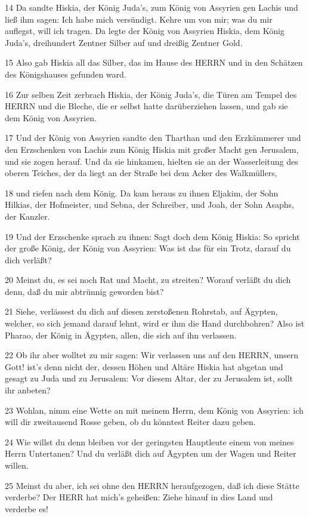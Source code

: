 \par 14 Da sandte Hiskia, der König Juda's, zum König von Assyrien gen Lachis und ließ ihm sagen: Ich habe mich versündigt. Kehre um von mir; was du mir auflegst, will ich tragen. Da legte der König von Assyrien Hiskia, dem König Juda's, dreihundert Zentner Silber auf und dreißig Zentner Gold.
\par 15 Also gab Hiskia all das Silber, das im Hause des HERRN und in den Schätzen des Königshauses gefunden ward.
\par 16 Zur selben Zeit zerbrach Hiskia, der König Juda's, die Türen am Tempel des HERRN und die Bleche, die er selbst hatte darüberziehen lassen, und gab sie dem König von Assyrien.
\par 17 Und der König von Assyrien sandte den Tharthan und den Erzkämmerer und den Erzschenken von Lachis zum König Hiskia mit großer Macht gen Jerusalem, und sie zogen herauf. Und da sie hinkamen, hielten sie an der Wasserleitung des oberen Teiches, der da liegt an der Straße bei dem Acker des Walkmüllers,
\par 18 und riefen nach dem König. Da kam heraus zu ihnen Eljakim, der Sohn Hilkias, der Hofmeister, und Sebna, der Schreiber, und Joah, der Sohn Asaphs, der Kanzler.
\par 19 Und der Erzschenke sprach zu ihnen: Sagt doch dem König Hiskia: So spricht der große König, der König von Assyrien: Was ist das für ein Trotz, darauf du dich verläßt?
\par 20 Meinst du, es sei noch Rat und Macht, zu streiten? Worauf verläßt du dich denn, daß du mir abtrünnig geworden bist?
\par 21 Siehe, verlässest du dich auf diesen zerstoßenen Rohrstab, auf Ägypten, welcher, so sich jemand darauf lehnt, wird er ihm die Hand durchbohren? Also ist Pharao, der König in Ägypten, allen, die sich auf ihn verlassen.
\par 22 Ob ihr aber wolltet zu mir sagen: Wir verlassen uns auf den HERRN, unsern Gott! ist's denn nicht der, dessen Höhen und Altäre Hiskia hat abgetan und gesagt zu Juda und zu Jerusalem: Vor diesem Altar, der zu Jerusalem ist, sollt ihr anbeten?
\par 23 Wohlan, nimm eine Wette an mit meinem Herrn, dem König von Assyrien: ich will dir zweitausend Rosse geben, ob du könntest Reiter dazu geben.
\par 24 Wie willst du denn bleiben vor der geringsten Hauptleute einem von meines Herrn Untertanen? Und du verläßt dich auf Ägypten um der Wagen und Reiter willen.
\par 25 Meinst du aber, ich sei ohne den HERRN heraufgezogen, daß ich diese Stätte verderbe? Der HERR hat mich's geheißen: Ziehe hinauf in dies Land und verderbe es!
